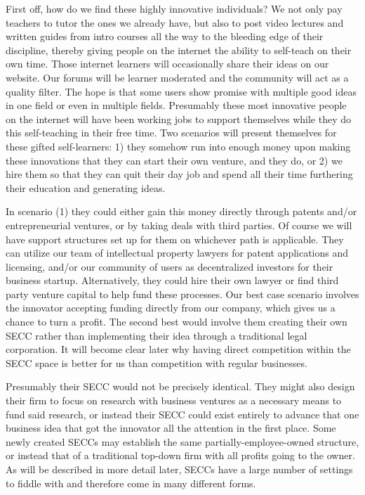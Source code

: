 \documentclass{article}[10pt]
\begin{document}
First off, how do we find these highly innovative individuals? 
We not only pay teachers to tutor the ones we already have, but also to post video lectures and written guides from intro courses all the way to the bleeding edge of their discipline, thereby giving people on the internet the ability to self-teach on their own time. 
Those internet learners will occasionally share their ideas on our website.
Our forums will be learner moderated and the community will act as a quality filter. 
The hope is that some users show promise with multiple good ideas in one field or even in multiple fields. 
Presumably these most innovative people on the internet will have been working jobs to support themselves while they do this self-teaching in their free time.
Two scenarios will present themselves for these gifted self-learners: 1) they somehow run into enough money upon making these innovations that they can start their own venture, and they do, or 2) we hire them so that they can quit their day job and spend all their time furthering their education and generating ideas. \par

In scenario (1) they could either gain this money directly through patents and/or entrepreneurial ventures, or by taking deals with third parties. 
Of course we will have support structures set up for them on whichever path is applicable.
They can utilize our team of intellectual property lawyers for patent applications and licensing, and/or our community of users as decentralized investors for their business startup.
Alternatively, they could hire their own lawyer or find third party venture capital to help fund these processes.
Our best case scenario involves the innovator accepting funding directly from our company, which gives us a chance to turn a profit.
The second best would involve them creating their own SECC rather than implementing their idea through a traditional legal corporation. 
It will become clear later why having direct competition within the SECC space is better for us than competition with regular businesses. \par

Presumably their SECC would not be precisely identical. 
They might also design their firm to focus on research with business ventures as a necessary means to fund said research, or instead their SECC could exist entirely to advance that one business idea that got the innovator all the attention in the first place.
Some newly created SECCs may establish the same partially-employee-owned structure, or instead that of a traditional top-down firm with all profits going to the owner. 
As will be described in more detail later, SECCs have a large number of settings to fiddle with and therefore come in many different forms.\par
\end{document}
